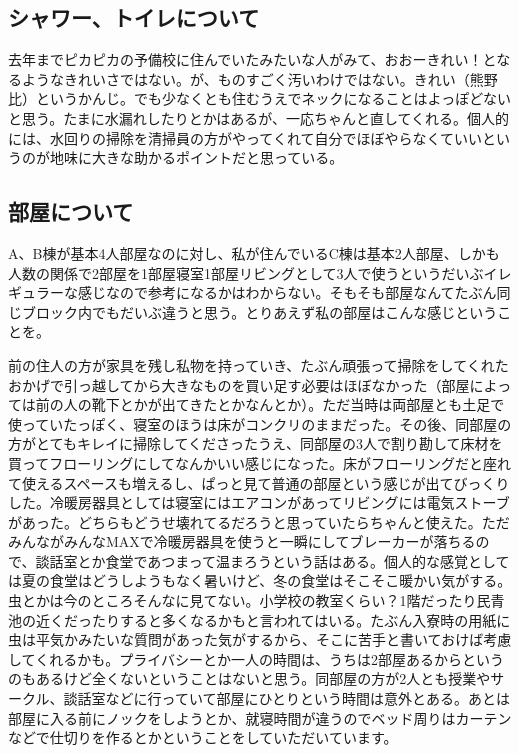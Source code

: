 \subsection{シャワー、トイレについて}
去年までピカピカの予備校に住んでいたみたいな人がみて、おおーきれい！となるようなきれいさではない。が、ものすごく汚いわけではない。きれい（熊野比）というかんじ。でも少なくとも住むうえでネックになることはよっぽどないと思う。たまに水漏れしたりとかはあるが、一応ちゃんと直してくれる。個人的には、水回りの掃除を清掃員の方がやってくれて自分でほぼやらなくていいというのが地味に大きな助かるポイントだと思っている。

\subsection{部屋について}
A、B棟が基本4人部屋なのに対し、私が住んでいるC棟は基本2人部屋、しかも人数の関係で2部屋を1部屋寝室1部屋リビングとして3人で使うというだいぶイレギュラーな感じなので参考になるかはわからない。そもそも部屋なんてたぶん同じブロック内でもだいぶ違うと思う。とりあえず私の部屋はこんな感じということを。

前の住人の方が家具を残し私物を持っていき、たぶん頑張って掃除をしてくれたおかげで引っ越してから大きなものを買い足す必要はほぼなかった（部屋によっては前の人の靴下とかが出てきたとかなんとか）。ただ当時は両部屋とも土足で使っていたっぽく、寝室のほうは床がコンクリのままだった。その後、同部屋の方がとてもキレイに掃除してくださったうえ、同部屋の3人で割り勘して床材を買ってフローリングにしてなんかいい感じになった。床がフローリングだと座れて使えるスペースも増えるし、ぱっと見て普通の部屋という感じが出てびっくりした。冷暖房器具としては寝室にはエアコンがあってリビングには電気ストーブがあった。どちらもどうせ壊れてるだろうと思っていたらちゃんと使えた。ただみんながみんなMAXで冷暖房器具を使うと一瞬にしてブレーカーが落ちるので、談話室とか食堂であつまって温まろうという話はある。個人的な感覚としては夏の食堂はどうしようもなく暑いけど、冬の食堂はそこそこ暖かい気がする。虫とかは今のところそんなに見てない。小学校の教室くらい？1階だったり民青池の近くだったりすると多くなるかもと言われてはいる。たぶん入寮時の用紙に虫は平気かみたいな質問があった気がするから、そこに苦手と書いておけば考慮してくれるかも。プライバシーとか一人の時間は、うちは2部屋あるからというのもあるけど全くないということはないと思う。同部屋の方が2人とも授業やサークル、談話室などに行っていて部屋にひとりという時間は意外とある。あとは部屋に入る前にノックをしようとか、就寝時間が違うのでベッド周りはカーテンなどで仕切りを作るとかということをしていただいています。


